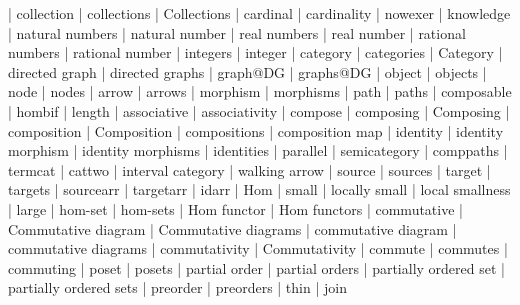     |   collection
    |   collections
    |   Collections
    |   cardinal
    |   cardinality
    |   nowexer
    |   knowledge
    |   natural numbers
    |   natural number
    |   real numbers
    |   real number
    |   rational numbers
    |   rational number
    |   integers
    |   integer
    |   category
    |   categories
    |   Category
    |   directed graph
    |   directed graphs
    |   graph@DG
    |   graphs@DG
    |   object
    |   objects
    |   node
    |   nodes
    |   arrow
    |   arrows
    |   morphism
    |   morphisms
    |   path
    |   paths
    |   composable
    |   hombif
    |   length
    |   associative
    |   associativity
    |   compose
    |   composing
    |   Composing
    |   composition
    |   Composition
    |   compositions
    |   composition map
    |   identity
    |   identity morphism
    |   identity morphisms
    |   identities
    |   parallel
    |   semicategory
    |   comppaths
    |   termcat
    |   cattwo
    |   interval category
    |   walking arrow
    |   source
    |   sources
    |   target
    |   targets
    |   sourcearr
    |   targetarr
    |   idarr
    |   Hom
    |   small
    |   locally small
    |   local smallness
    |   large
    |   hom-set
    |   hom-sets
    |   Hom functor
    |   Hom functors
    |   commutative
    |   Commutative diagram
    |   Commutative diagrams
    |   commutative diagram
    |   commutative diagrams
    |   commutativity
    |   Commutativity
    |   commute
    |   commutes
    |   commuting
    |   poset
    |   posets
    |   partial order
    |   partial orders
    |   partially ordered set
    |   partially ordered sets
    |   preorder
    |   preorders
    |   thin
    |   join
